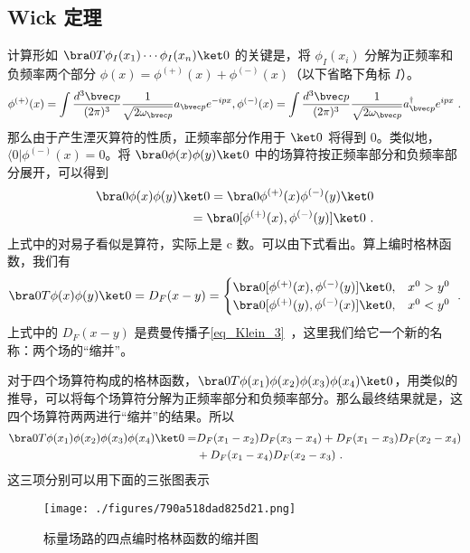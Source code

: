 \subsection{Wick 定理}
计算形如 $\bra 0 T\phi_I(x_1)\cdots\phi_I(x_n) \ket 0$ 的关键是，将 $\phi_I(x_i)$ 分解为正频率和负频率两个部分 $\phi( x)=\phi^{(+)}( x)+\phi^{(-)}( x)$（以下省略下角标 $I$）。
\begin{equation}
\phi^{(+)}( x) = \int \frac{d{}^3{\bvec p}}{(2\pi)^3} \frac{1}{\sqrt{2\omega_{\bvec p}}}a_{\bvec p} e^{-ipx} ,
\phi^{(-)}( x) = \int \frac{d{}^3{\bvec p}}{(2\pi)^3} \frac{1}{\sqrt{2\omega_{\bvec p}}}a_{\bvec p}^\dagger e^{ipx} ~.
\end{equation}
那么由于产生湮灭算符的性质，正频率部分作用于 $\ket 0$ 将得到 $0$。类似地，$\langle 0| \phi^{(-)}( x)=0$。将 $\bra 0 \phi(x)\phi(y)\ket 0$ 中的场算符按正频率部分和负频率部分展开，可以得到
\begin{equation}
\begin{aligned}
\bra 0 \phi( x)\phi( y)\ket 0=\bra 0 \phi^{(+)}( x)\phi^{(-)}( y)\ket 0\\
 = \bra 0[\phi^{(+)}( x),\phi^{(-)}( y)]\ket 0~.
\end{aligned}
\end{equation}
上式中的对易子看似是算符，实际上是 c 数。可以由下式看出。算上编时格林函数，我们有
\begin{equation}
\bra 0 T\phi( x)\phi( y)\ket 0=D_F(x-y)=\begin{cases}
\bra 0[\phi^{(+)}( x),\phi^{(-)}( y)]\ket 0, &x^0>y^0\\
\bra 0[\phi^{(+)}( y),\phi^{(-)}( x)]\ket 0, &x^0<y^0
\end{cases}~.
\end{equation}
上式中的 $D_F(x-y)$ 是费曼传播子\autoref{eq_Klein_3}~，这里我们给它一个新的名称：两个场的“缩并”。

对于四个场算符构成的格林函数，$\bra 0 T\phi(x_1)\phi(x_2)\phi(x_3)\phi(x_4)\ket 0$，用类似的推导，可以将每个场算符分解为正频率部分和负频率部分。那么最终结果就是，这四个场算符两两进行“缩并”的结果。所以
\begin{equation}
\begin{aligned}
\bra 0 T\phi(x_1)\phi(x_2)\phi(x_3)\phi(x_4)\ket 0=&D_F(x_1-x_2)D_F(x_3-x_4)+D_F(x_1-x_3)D_F(x_2-x_4)
\\&+D_F(x_1-x_4)D_F(x_2-x_3)~.
\end{aligned}
\end{equation}
这三项分别可以用下面的三张图表示
\begin{figure}[ht]
\centering
\texttt{[image: ./figures/790a518dad825d21.png]}
\caption{标量场路的四点编时格林函数的缩并图} \label{fig_wick_1}
\end{figure}

